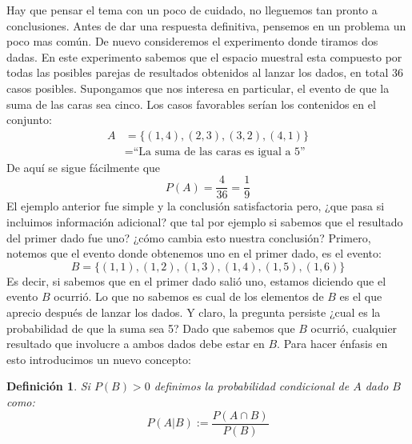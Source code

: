 \documentclass[14pt]{extreport}
\theoremstyle{definicion}
\newtheorem{definition}{Definición}[chapter]
\theoremstyle{propiedad}
\begin{document}
Hay que pensar el tema con un poco de cuidado, no lleguemos tan pronto a conclusiones. Antes de dar una respuesta definitiva, pensemos en un problema un poco mas común. De nuevo consideremos el experimento donde tiramos dos dadas. En este experimento sabemos que el espacio muestral esta compuesto por todas las posibles parejas de resultados obtenidos al lanzar los dados, en total 36 casos posibles. Supongamos que nos interesa en particular, el evento de que la suma de las caras sea cinco. Los casos favorables serían los contenidos en el conjunto: 
\begin{equation*}
\begin{split}
A & = \{(1, 4), (2, 3), (3, 2), (4, 1)\}\\
  & = \text{``La suma de las caras es igual a 5''}
\end{split}    
\end{equation*}
De aquí se sigue fácilmente que 
$$
P(A) =\frac{4}{36} = \frac{1}{9}
$$
El ejemplo anterior fue simple y la conclusión satisfactoria pero, ¿que pasa si incluimos información adicional? que tal por ejemplo si sabemos que el resultado del primer dado fue uno? ¿cómo cambia esto nuestra conclusión? Primero, notemos que el evento donde obtenemos uno en el primer dado, es el evento: 
$$
B = \{(1, 1), (1, 2), (1, 3), (1, 4), (1, 5), (1, 6)\} 
$$
Es decir, si sabemos que en el primer dado salió uno, estamos diciendo que el evento $B$ ocurrió. Lo que no sabemos es cual de los elementos de $B$ es el que aprecio después de lanzar los dados. Y claro, la pregunta persiste ¿cual es la probabilidad de que la suma sea 5? Dado que sabemos que $B$ ocurrió, cualquier resultado que involucre a ambos dados debe estar en $B$. Para hacer énfasis en esto introducimos un nuevo concepto:
\begin{definition}
    Si $P(B)>0$ definimos la \emph{probabilidad condicional} de $A$ dado $B$ como: 
    $$
    P(A \vert B) := \frac{P(A \cap B)} {P(B)}
    $$
\end{definition}
\end{document}
